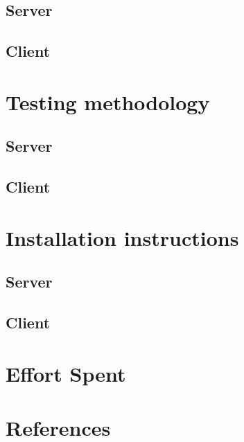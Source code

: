 	\section{Server}
		
	\section{Client}
\newpage
\chapter{Testing methodology}
	\section{Server}
		
	\section{Client}
\newpage
\chapter{Installation instructions}
	\section{Server}
		
	\section{Client}
\newpage
\chapter{Effort Spent}
    
\chapter{References}
	


